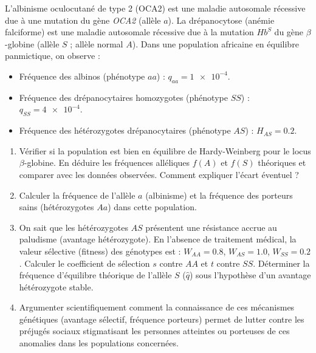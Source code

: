 \documentclass[11pt]{article}
\begin{document}
\begin{exercice}
L'albinisme oculocutané de type 2 (OCA2) est une maladie autosomale récessive due à une mutation du gène \textit{OCA2} (allèle $a$). La drépanocytose (anémie falciforme) est une maladie autosomale récessive due à la mutation $Hb^S$ du gène $\beta$-globine (allèle $S$ ; allèle normal $A$). Dans une population africaine en équilibre panmictique, on observe :
\begin{itemize}
    \item Fréquence des albinos (phénotype $aa$) : $q_{aa} = \num{1e-4}$.
    \item Fréquence des drépanocytaires homozygotes (phénotype $SS$) : $q_{SS} = \num{4e-4}$.
    \item Fréquence des hétérozygotes drépanocytaires (phénotype $AS$) : $H_{AS} = \num{0.2}$.
\end{itemize}
\begin{enumerate}
    \item Vérifier si la population est bien en équilibre de Hardy-Weinberg pour le locus $\beta$-globine. En déduire les fréquences alléliques $f(A)$ et $f(S)$ théoriques et comparer avec les données observées. Comment expliquer l'écart éventuel ?
    \item Calculer la fréquence de l'allèle $a$ (albinisme) et la fréquence des porteurs sains (hétérozygotes $Aa$) dans cette population.
    \item On sait que les hétérozygotes $AS$ présentent une résistance accrue au paludisme (avantage hétérozygote). En l'absence de traitement médical, la valeur sélective (fitness) des génotypes est : $W_{AA}=0.8$, $W_{AS}=1.0$, $W_{SS}=0.2$. Calculer le coefficient de sélection $s$ contre $AA$ et $t$ contre $SS$. Déterminer la fréquence d'équilibre théorique de l'allèle $S$ ($\hat{q}$) sous l'hypothèse d'un avantage hétérozygote stable.
    \item Argumenter scientifiquement comment la connaissance de ces mécanismes génétiques (avantage sélectif, fréquence porteurs) permet de lutter contre les préjugés sociaux stigmatisant les personnes atteintes ou porteuses de ces anomalies dans les populations concernées.
\end{enumerate}
\end{exercice}
\end{document}
